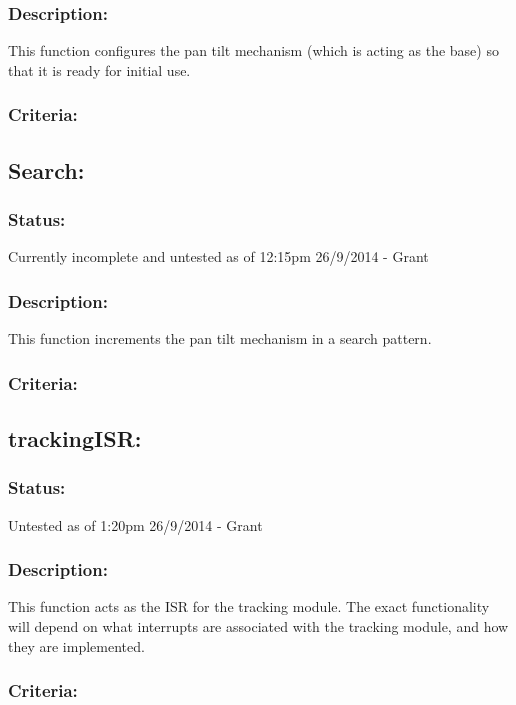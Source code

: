 \documentclass[]{article}
\begin{document}
\subsubsection{Description:}
This function configures the pan tilt mechanism (which is acting as the base) so that it is ready for initial use.

\subsubsection{Criteria:}

\subsection{Search:}
\subsubsection{Status:}
Currently incomplete and untested as of 12:15pm 26/9/2014 - Grant

\subsubsection{Description:}
This function increments the pan tilt mechanism in a search pattern.

\subsubsection{Criteria:}

\subsection{trackingISR:}
\subsubsection{Status:}
Untested as of 1:20pm 26/9/2014 - Grant

\subsubsection{Description:}
This function acts as the ISR for the tracking module. The exact functionality will depend on what interrupts are associated with the tracking module, and how they are implemented.

\subsubsection{Criteria:}
\end{document}
